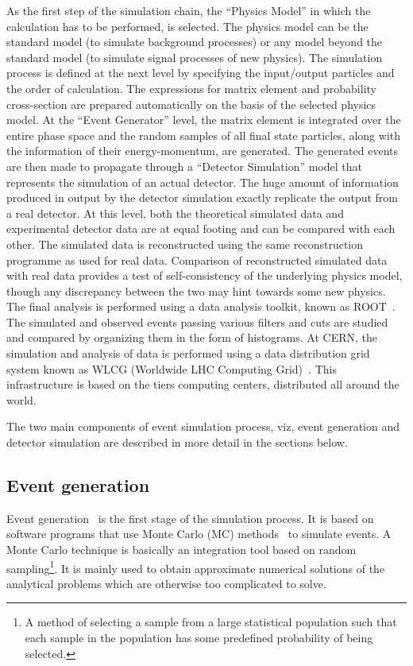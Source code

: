 As the first step of the simulation chain, the ``Physics Model'' in which the calculation has to be performed, is selected. The physics model can be the
standard model (to simulate background processes) or any model beyond the standard model (to simulate signal processes of new physics).  
The simulation process is defined at the next level by specifying the input$/$output particles and the order of calculation. The expressions for matrix element and
probability cross-section are prepared automatically on the basis of the selected physics model.   
At the ``Event Generator'' level, the matrix element is integrated over the entire phase space and the random samples of all final state particles, along with
the information of their energy-momentum, are generated. The generated events are then made to propagate through a ``Detector Simulation'' model
that represents the simulation of an actual detector.    
The huge amount of information produced in output by the detector simulation exactly replicate the output from a real detector. At this level,
both the theoretical simulated data and experimental detector data are at equal footing and can be compared with each other. The simulated data
is reconstructed using the same reconstruction programme as used for real data. Comparison of reconstructed simulated data with real data
provides a test of self-consistency of the underlying physics model, though any discrepancy between the two may hint towards some new physics. 
The final analysis is performed using a data analysis toolkit, known as ROOT~\cite{Brun:1997pa}. The simulated and observed events passing various
filters and cuts are studied and compared by organizing them in the form of histograms. At CERN, the simulation and analysis of data is performed using
a data distribution grid system known as WLCG (Worldwide LHC Computing Grid)~\cite{WLCG}. This infrastructure is based on the tiers
computing centers, distributed all around the world.

The two main components of event simulation process, viz, event generation and detector simulation are described in more detail in the sections below.
\subsection{Event generation}
Event generation~\cite{Buckley:2011ms, Dobbs:2004qw} is the first stage of the simulation process.
It is based on software programs that use Monte Carlo (MC) methods~\cite{robert2004monte, MC_Tech} to simulate events.
A Monte Carlo technique is basically an integration tool based on random sampling\footnote{A method of selecting a sample from a large statistical population such that
  each sample in the population has some predefined probability of being selected.}. It is mainly used to obtain approximate numerical solutions
of the analytical problems which are otherwise too complicated to solve. 

